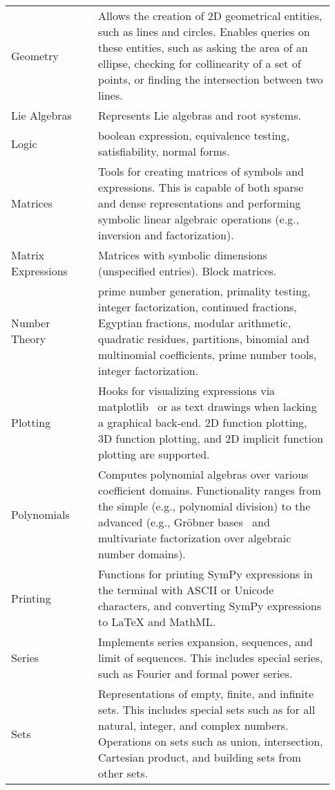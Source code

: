 \begin{longtable}[htbc]{p{0.25\linewidth}p{0.68\linewidth}}
Geometry & Allows the creation of 2D geometrical entities, such as lines and
circles. Enables queries on these entities, such as asking the area of an
ellipse, checking for collinearity of a set of
points, or finding the intersection between two lines.\\

Lie Algebras & Represents Lie algebras and root systems.\\

Logic & boolean expression, equivalence testing, satisfiability, normal
forms.\\

Matrices & Tools for creating matrices of symbols and expressions. This is
capable of both sparse and dense representations and performing
symbolic linear algebraic operations (e.g., inversion and factorization).\\

Matrix Expressions & Matrices with symbolic dimensions (unspecified entries).
Block matrices.\\

Number Theory & prime number generation, primality testing, integer
factorization, continued fractions, Egyptian fractions, modular arithmetic,
quadratic residues, partitions, binomial and multinomial coefficients,
prime number tools, integer factorization. \\

Plotting & Hooks for visualizing expressions via matplotlib~\cite{Hunter:2007}
or as text drawings when lacking a graphical back-end. 2D function plotting,
3D function
plotting, and 2D implicit function plotting are supported.\\

Polynomials & Computes polynomial algebras over various coefficient domains.
Functionality ranges from the simple (e.g., polynomial division) to the
advanced (e.g., Gr\"obner bases~\cite{adams1994introduction} and multivariate
factorization over algebraic number domains).\\

Printing & Functions for printing SymPy expressions in the terminal with ASCII
or Unicode characters, and converting SymPy expressions to \LaTeX{} and
MathML.\\

Series & Implements series expansion, sequences, and limit of sequences.
This includes special series, such as Fourier and formal power series.\\

Sets & Representations of empty, finite, and infinite sets. This includes
special sets such as for all natural, integer, and complex numbers. Operations
on sets such as union, intersection, Cartesian product, and building sets from
other sets.\\


\end{longtable}
